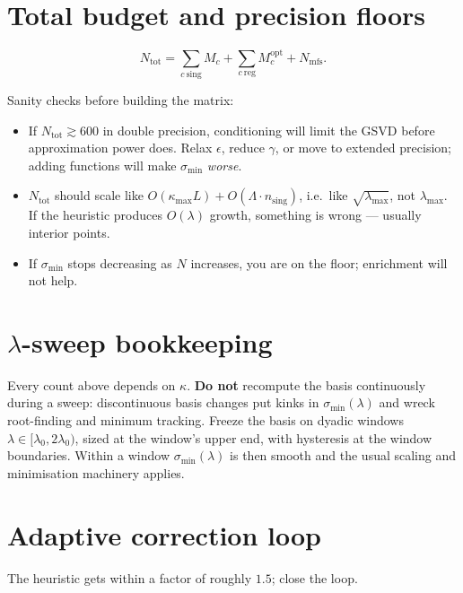 \documentclass[11pt]{article}
\begin{document}
\section{Total budget and precision floors}
\label{sec:budget}

\[
  N_{\mathrm{tot}}=\sum_{c\ \mathrm{sing}}M_c
    +\sum_{c\ \mathrm{reg}}M_c^{\mathrm{opt}}
    +N_{\mathrm{mfs}}.
\]

Sanity checks before building the matrix:

\begin{itemize}[leftmargin=1.4em]
\item If $N_{\mathrm{tot}}\gtrsim 600$ in double precision, conditioning will limit
  the GSVD before approximation power does. Relax $\epsilon$, reduce $\gamma$, or move
  to extended precision; adding functions will make $\sigma_{\min}$ \emph{worse}.
\item $N_{\mathrm{tot}}$ should scale like
  $O(\kappa_{\max}L)+O(\Lambda\cdot n_{\mathrm{sing}})$, i.e.\ like
  $\sqrt{\lambda_{\max}}$, not $\lambda_{\max}$. If the heuristic produces
  $O(\lambda)$ growth, something is wrong --- usually interior points.
\item If $\sigma_{\min}$ stops decreasing as $N$ increases, you are on the floor;
  enrichment will not help.
\end{itemize}

\section{\texorpdfstring{$\lambda$}{lambda}-sweep bookkeeping}
\label{sec:sweep}

Every count above depends on $\kappa$. \textbf{Do not} recompute the basis
continuously during a sweep: discontinuous basis changes put kinks in
$\sigma_{\min}(\lambda)$ and wreck root-finding and minimum tracking. Freeze the basis
on dyadic windows $\lambda\in[\lambda_0,2\lambda_0)$, sized at the window's upper end,
with hysteresis at the window boundaries. Within a window $\sigma_{\min}(\lambda)$ is
then smooth and the usual scaling and minimisation machinery applies.

\section{Adaptive correction loop}
\label{sec:adaptive}

The heuristic gets within a factor of roughly $1.5$; close the loop.
\end{document}
